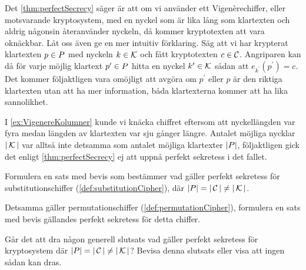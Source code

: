 Det \cref{thm:perfectSecrecy} säger är att om vi använder ett 
Vigenèrechiffer, eller motsvarande kryptosystem, med en nyckel som är lika lång 
som klartexten och aldrig någonsin återanvänder nyckeln, då kommer kryptotexten 
att vara oknäckbar.
Låt oss även ge en mer intuitiv förklaring.
Säg att vi har krypterat klartexten \(p\in \P\) med nyckeln \(k\in \operatorname{\mathcal{K}}\) och 
fått kryptotexten \(c\in \operatorname{\mathcal{C}}\).
Angriparen kan då för varje möjlig klartext \(p^\prime\in \P\) hitta en nyckel 
\(k^\prime\in \operatorname{\mathcal{K}}\) sådan att \(e_{k^\prime}(p^\prime) = c\).
Det kommer följaktligen vara omöjligt att avgöra om \(p^\prime\) eller \(p\) är 
den riktiga klartexten utan att ha mer information, båda klartexterna kommer 
att ha lika sannolikhet.

I \cref{ex:VigenereKolumner} kunde vi knäcka chiffret eftersom att 
nyckellängden var fyra medan längden av klartexten var sju gånger längre.
Antalet möjliga nycklar \(|\operatorname{\mathcal{K}}|\) var alltså inte detsamma som antalet möjliga 
klartexter \(|\P|\), följaktligen gick det enligt 
\cref{thm:perfectSecrecy} ej att uppnå perfekt sekretess i det fallet.

\begin{exercise}
  Formulera en sats med bevis som bestämmer vad gäller perfekt sekretess för 
  substitutionschiffer (\cref{def:substitutionCipher}), där \(|\P| 
  = |\C|\neq |\K|\).
\end{exercise}
\begin{exercise}
  Detsamma gäller permutationschiffer (\cref{def:permutationCipher}), 
  formulera en sats med bevis gällandes perfekt sekretess för detta chiffer.
\end{exercise}
\begin{exercise}
  Går det att dra någon generell slutsats vad gäller perfekt sekretess för 
  kryptosystem där \(|\P| = |\C|\neq |\K|\)?
  Bevisa denna slutsats eller visa att ingen sådan kan dras.
\end{exercise}

